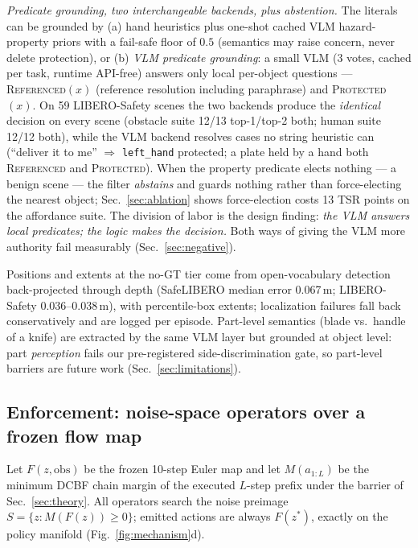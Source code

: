 \documentclass[conference]{IEEEtran}
\begin{document}
\emph{Predicate grounding, two interchangeable backends, plus abstention.} The literals can be grounded by (a) hand heuristics plus one-shot cached VLM hazard-property priors with a fail-safe floor of $0.5$ (semantics may raise concern, never delete protection), or (b) \emph{VLM predicate grounding}: a small VLM (3 votes, cached per task, runtime API-free) answers only local per-object questions --- \textsc{Referenced}$(x)$ (reference resolution including paraphrase) and \textsc{Protected}$(x)$. On 59 LIBERO-Safety scenes the two backends produce the \emph{identical} decision on every scene (obstacle suite 12/13 top-1/top-2 both; human suite 12/12 both), while the VLM backend resolves cases no string heuristic can (``deliver it to me'' $\Rightarrow$ \texttt{left\_hand} protected; a plate held by a hand both \textsc{Referenced} and \textsc{Protected}). When the property predicate elects nothing --- a benign scene --- the filter \emph{abstains} and guards nothing rather than force-electing the nearest object; Sec.~\ref{sec:ablation} shows force-election costs 13 TSR points on the affordance suite. The division of labor is the design finding: \emph{the VLM answers local predicates; the logic makes the decision.} Both ways of giving the VLM more authority fail measurably (Sec.~\ref{sec:negative}).

Positions and extents at the no-GT tier come from open-vocabulary detection \cite{gdino} back-projected through depth (SafeLIBERO median error 0.067\,m; LIBERO-Safety 0.036--0.038\,m), with percentile-box extents; localization failures fall back conservatively and are logged per episode. Part-level semantics (blade vs.\ handle of a knife) are extracted by the same VLM layer but grounded at object level: part \emph{perception} fails our pre-registered side-discrimination gate, so part-level barriers are future work (Sec.~\ref{sec:limitations}).

\subsection{Enforcement: noise-space operators over a frozen flow map}
\label{sec:operators}

Let $F(z,\mathrm{obs})$ be the frozen 10-step Euler map and let $M(a_{1:L})$ be the minimum DCBF chain margin of the executed $L$-step prefix under the barrier of Sec.~\ref{sec:theory}. All operators search the noise preimage $S=\{z: M(F(z))\ge 0\}$; emitted actions are always $F(z^\ast)$, exactly on the policy manifold (Fig.~\ref{fig:mechanism}d).
\end{document}
